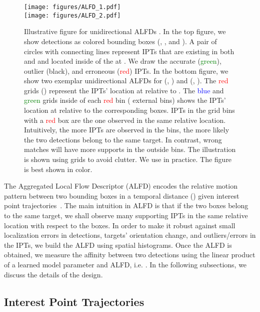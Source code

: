 \documentclass[10pt,twocolumn,letterpaper]{article}
\begin{document}
\begin{figure}
\begin{center}
\texttt{[image: figures/ALFD\_1.pdf]}\\
\texttt{[image: figures/ALFD\_2.pdf]}\\
\end{center}
\caption{Illustrative figure for unidirectional ALFDs . In the top figure, we show detections as colored bounding boxes (, , and ). A pair of circles with connecting lines represent IPTs that are existing in both  and  and located inside of the  at . We draw the accurate (\textcolor{green}{green}), outlier (black), and erroneous (\textcolor{red}{red}) IPTs. In the bottom figure, we show two exemplar unidirectional ALFDs  for (, ) and (, ). The \textcolor{red}{red} grids () represent the IPTs' location at  relative to . The \textcolor{blue}{blue} and \textcolor{green}{green} grids inside of each \textcolor{red}{red} bin ( external bins) shows the IPTs' location at  relative to the corresponding boxes. IPTs in the grid bins with a \textcolor{red}{red} box are the one observed in the same relative location. Intuitively, the more IPTs are observed in the bins, the more likely the two detections belong to the same target. In contrast, wrong matches will have more supports in the outside bins. The illustration is shown using  grids to avoid clutter. We use  in practice. The figure is best shown in color.}
\label{fig:ALFDV2}
\end{figure}

The Aggregated Local Flow Descriptor (ALFD) encodes the relative motion pattern between two bounding boxes in a temporal distance () given interest point trajectories~\cite{Tomasi_CMUTR_91}. The main intuition in ALFD is that if the two boxes belong to the same target, we shall observe many supporting IPTs in the same relative location with respect to the boxes. In order to make it robust against small localization errors in detections, targets' orientation change, and outliers/errors in the IPTs, we build the ALFD using spatial histograms. Once the ALFD is obtained, we measure the affinity between two detections using the linear product of a learned model parameter  and ALFD, i.e. . In the following subsections, we discuss the details of the design.

\subsection{Interest Point Trajectories}
\end{document}
